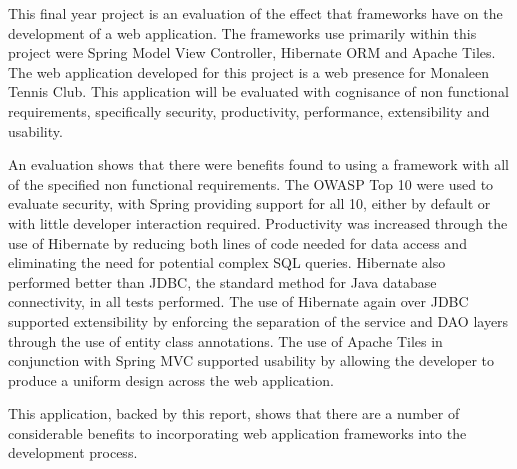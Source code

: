 This final year project is an evaluation of the effect that frameworks have on the development of a web application. The frameworks use primarily within this project were Spring Model View Controller, Hibernate ORM and Apache Tiles. The web application developed for this project is a web presence for Monaleen Tennis Club. This application will be evaluated with cognisance of non functional requirements, specifically security, productivity, performance, extensibility and usability.

An evaluation shows that there were benefits found to using a framework with all of the specified non functional requirements. The OWASP Top 10 were used to evaluate security, with Spring providing support for all 10, either by default or with little developer interaction required. Productivity was increased through the use of Hibernate by reducing both lines of code needed for data access and eliminating the need for potential complex SQL queries. Hibernate also performed better than JDBC, the standard method for Java database connectivity, in all tests performed. The use of Hibernate again over JDBC supported extensibility by enforcing the separation of the service and DAO layers through the use of entity class annotations. The use of Apache Tiles in conjunction with Spring MVC supported usability by allowing the developer to produce a uniform design across the web application. 

This application, backed by this report, shows that there are a number of considerable benefits to incorporating web application frameworks into the development process. 





